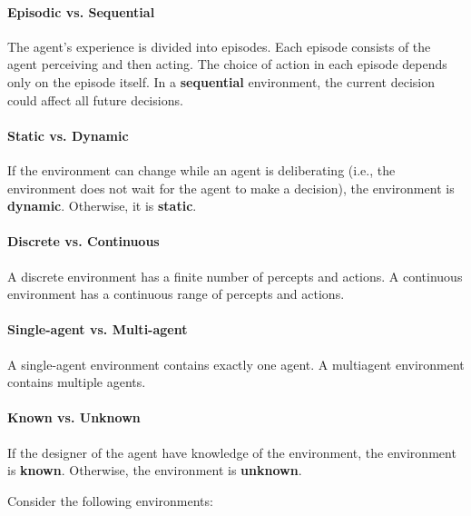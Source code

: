 \documentclass[a4paper,12pt]{article}
\begin{document}
\paragraph{Episodic vs. Sequential} The agent's experience is divided into episodes. Each episode consists of the agent perceiving and then acting. The choice of action in each episode depends only on the episode itself. In a \textbf{sequential} environment, the current decision could affect all future decisions.

\paragraph{Static vs. Dynamic} If the environment can change while an agent is deliberating (i.e., the environment does not wait for the agent to make a decision), the environment is \textbf{dynamic}. Otherwise, it is \textbf{static}.

\paragraph{Discrete vs. Continuous} A discrete environment has a finite number of percepts and actions. A continuous environment has a continuous range of percepts and actions.

\paragraph{Single-agent vs. Multi-agent} A single-agent environment contains exactly one agent. A multiagent environment contains multiple agents.

\paragraph{Known vs. Unknown} If the designer of the agent have knowledge of the environment, the environment is \textbf{known}. Otherwise, the environment is \textbf{unknown}.

\begin{examplebox}
  Consider the following environments:
  \begin{table}[H]
  \end{table}
\end{examplebox}
\end{document}
